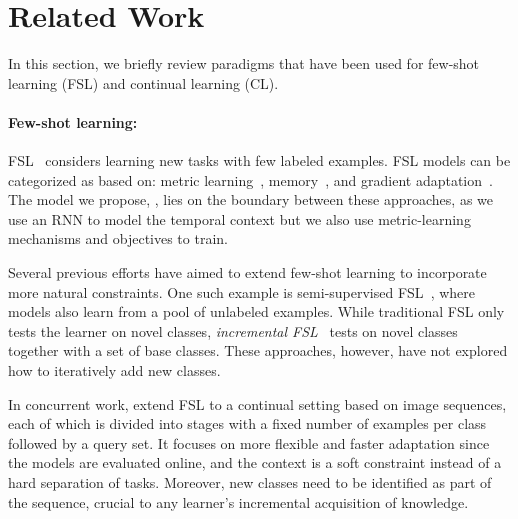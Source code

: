 
\section{Related Work}
\vspace{-0.1in}
In this section, we briefly review paradigms that have been used for few-shot learning (FSL) and
continual learning (CL). 
% 

\vspace{-0.1in}
\paragraph{Few-shot learning:} 
FSL~\citep{omniglot,generativefewshot,siamese,matchingnet} considers learning new tasks with few
labeled examples. FSL models can be categorized as based on: metric
learning~\citep{matchingnet,protonet}, memory~\citep{mann}, and gradient
adaptation~\citep{maml,metasgd}. The model we propose, \ourmodelshort, lies on the boundary between
these approaches, as we use an RNN to model the temporal context but we also use metric-learning
mechanisms and objectives to train.

Several previous efforts have aimed to extend few-shot learning to incorporate more natural
constraints. One such example is semi-supervised FSL~\citep{fewshotssl}, where models also learn 
from a pool of unlabeled examples. While traditional FSL only
tests the learner on novel classes, \emph{incremental FSL}~\citep{lwof,attnattractor} tests on novel
classes together with a set of base classes. These approaches, however, have not explored how to
iteratively add new classes.

In concurrent work, \citet{contfsl} extend FSL to a continual setting based on image sequences, each
of which is divided into stages with a fixed number of examples per class followed by a query set. It
focuses on more flexible and faster adaptation since the models are evaluated online, and the context is
a soft constraint instead of a hard separation of tasks. Moreover, new classes need to be identified
as part of the sequence, crucial to any learner's incremental acquisition of knowledge.

